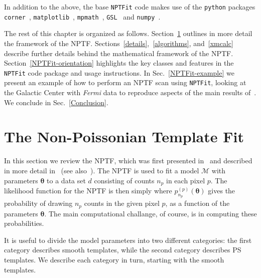 In addition to the above, the base \texttt{NPTFit} code makes use of the \texttt{python} packages \texttt{corner}~\cite{dan_foreman_mackey_2016_53155}, \texttt{matplotlib}~\cite{Hunter:2007}, \texttt{mpmath}~\cite{mpmath}, \texttt{GSL}~\cite{galassi2015gnu} and  \texttt{numpy}~\cite{oliphant2006guide}.

The rest of this chapter is organized as follows.  Section~\ref{NPTF} outlines in more detail the framework of the NPTF. Sections~\ref{details},~\ref{algorithms}, and~\ref{xmcalc} describe further details behind the mathematical framework of the NPTF. Section~\ref{NPTFit-orientation} highlights the key classes and features in the \texttt{NPTFit} code package and usage instructions.  In Sec.~\ref{NPTFit-example} we present an example of how to perform an NPTF scan using \texttt{NPTFit}, looking at the Galactic Center with \emph{Fermi} data to reproduce aspects of the main results of~\cite{Lee:2015fea}. We conclude in Sec.~\ref{Conclusion}. 

\section{The Non-Poissonian Template Fit}
\label{NPTF}

In this section we review the NPTF, which was first presented in~\cite{Lee:2015fea} and described in more detail in~\cite{Linden:2016rcf,Lisanti:2016jub} (see also~\cite{Malyshev:2011zi,Lee:2014mza,Zechlin:2015wdz,Zechlin:2016pme}).  The NPTF is used to fit a model $\mathcal{M}$ with parameters $\bm{\theta}$ to a data set $d$ consisting of counts $n_p$ in each pixel $p$.  The likelihood function for the NPTF is then simply
where $p_{n_p}^{(p)}( {\bm \theta})$ gives the probability of drawing $n_p$ counts in the given pixel $p$, as a function of the parameters $\bm{\theta}$.  The main computational challange, of course, is in computing these probabilities.

It is useful to divide the model parameters into two different categories: the first category describes smooth templates, while the second category describes PS templates.  We describe each category in turn, starting with the smooth templates.  

